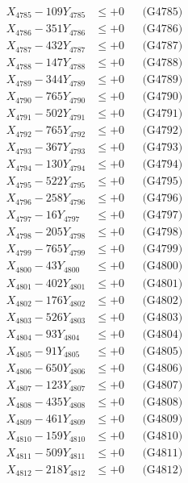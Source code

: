 \documentclass[a4paper,10pt]{article}
\begin{document}
{\begin{align}
X_{4785} - 109Y_{4785} &\leq +0 && \text{(G4785)} \\
X_{4786} - 351Y_{4786} &\leq +0 && \text{(G4786)} \\
X_{4787} - 432Y_{4787} &\leq +0 && \text{(G4787)} \\
X_{4788} - 147Y_{4788} &\leq +0 && \text{(G4788)} \\
X_{4789} - 344Y_{4789} &\leq +0 && \text{(G4789)} \\
X_{4790} - 765Y_{4790} &\leq +0 && \text{(G4790)} \\
\allowbreak
X_{4791} - 502Y_{4791} &\leq +0 && \text{(G4791)} \\
X_{4792} - 765Y_{4792} &\leq +0 && \text{(G4792)} \\
X_{4793} - 367Y_{4793} &\leq +0 && \text{(G4793)} \\
X_{4794} - 130Y_{4794} &\leq +0 && \text{(G4794)} \\
X_{4795} - 522Y_{4795} &\leq +0 && \text{(G4795)} \\
X_{4796} - 258Y_{4796} &\leq +0 && \text{(G4796)} \\
X_{4797} - 16Y_{4797} &\leq +0 && \text{(G4797)} \\
X_{4798} - 205Y_{4798} &\leq +0 && \text{(G4798)} \\
X_{4799} - 765Y_{4799} &\leq +0 && \text{(G4799)} \\
X_{4800} - 43Y_{4800} &\leq +0 && \text{(G4800)} \\
\allowbreak
X_{4801} - 402Y_{4801} &\leq +0 && \text{(G4801)} \\
X_{4802} - 176Y_{4802} &\leq +0 && \text{(G4802)} \\
X_{4803} - 526Y_{4803} &\leq +0 && \text{(G4803)} \\
X_{4804} - 93Y_{4804} &\leq +0 && \text{(G4804)} \\
X_{4805} - 91Y_{4805} &\leq +0 && \text{(G4805)} \\
X_{4806} - 650Y_{4806} &\leq +0 && \text{(G4806)} \\
X_{4807} - 123Y_{4807} &\leq +0 && \text{(G4807)} \\
X_{4808} - 435Y_{4808} &\leq +0 && \text{(G4808)} \\
X_{4809} - 461Y_{4809} &\leq +0 && \text{(G4809)} \\
X_{4810} - 159Y_{4810} &\leq +0 && \text{(G4810)} \\
\allowbreak
X_{4811} - 509Y_{4811} &\leq +0 && \text{(G4811)} \\
X_{4812} - 218Y_{4812} &\leq +0 && \text{(G4812)} \\

\end{align}}
\end{document}
